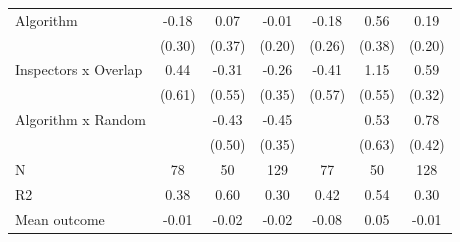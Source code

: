 \begin{tabular}{lccc|ccc}
Algorithm   &       -0.18         &        0.07         &       -0.01         &       -0.18         &        0.56         &        0.19         \\
            &      (0.30)         &      (0.37)         &      (0.20)         &      (0.26)         &      (0.38)         &      (0.20)         \\
\addlinespace
Inspectors x Overlap&        0.44         &       -0.31         &       -0.26         &       -0.41         &        1.15\sym{**} &        0.59\sym{*}  \\
            &      (0.61)         &      (0.55)         &      (0.35)         &      (0.57)         &      (0.55)         &      (0.32)         \\
\addlinespace
Algorithm x Random&                     &       -0.43         &       -0.45         &                     &        0.53         &        0.78\sym{*}  \\
            &                     &      (0.50)         &      (0.35)         &                     &      (0.63)         &      (0.42)         \\
\midrule
N           &          78         &          50         &         129         &          77         &          50         &         128         \\
R2          &        0.38         &        0.60         &        0.30         &        0.42         &        0.54         &        0.30         \\
Mean outcome&       -0.01         &       -0.02         &       -0.02         &       -0.08         &        0.05         &       -0.01         \\
\bottomrule \end{tabular}
